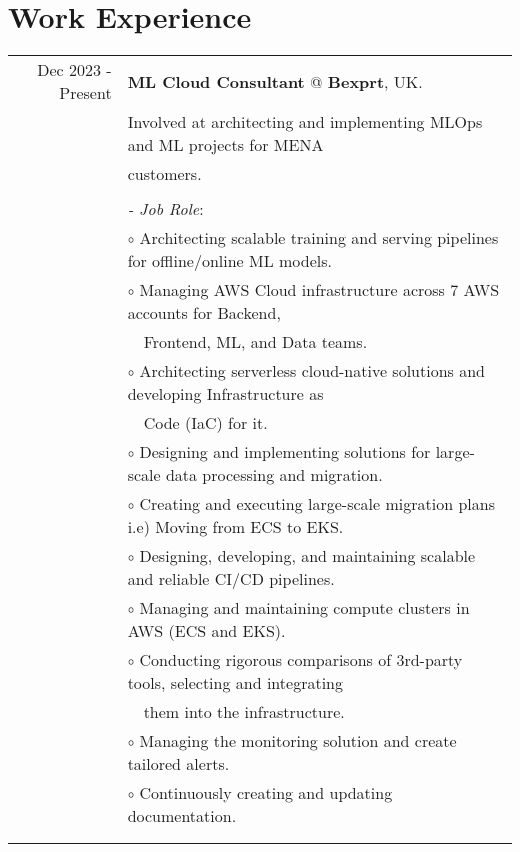 \documentclass[a4paper,10pt]{article}
\begin{document}
\section{\textbf{Work Experience}}
\begin{longtable}{r|l}
    Dec 2023 - Present& \textbf{ML Cloud Consultant} @
    \textbf{Bexprt}, UK. \\&
    Involved at architecting and implementing MLOps and ML projects for MENA \\& customers. \\&
    \\&
    \textit{- Job Role}:\\&
    $\circ$ Architecting scalable training and serving pipelines for offline/online ML models. \\&
    $\circ$ Managing AWS Cloud infrastructure across 7 AWS accounts for Backend,\\&~~Frontend, ML, and Data teams. \\&
    $\circ$ Architecting serverless cloud-native solutions and developing Infrastructure as \\&~~Code (IaC) for it. \\&
    $\circ$ Designing and implementing solutions for large-scale data processing and migration. \\&
    $\circ$ Creating and executing large-scale migration plans i.e) Moving from ECS to EKS. \\&
    $\circ$ Designing, developing, and maintaining scalable and reliable CI/CD pipelines. \\&
    $\circ$ Managing and maintaining compute clusters in AWS (ECS and EKS). \\&
    $\circ$ Conducting rigorous comparisons of 3rd-party tools, selecting and integrating \\& ~~them into the infrastructure. \\&
    $\circ$ Managing the monitoring solution and create tailored alerts. \\&
    $\circ$ Continuously creating and updating documentation. \\&
    \\&

\end{longtable}
\end{document}
